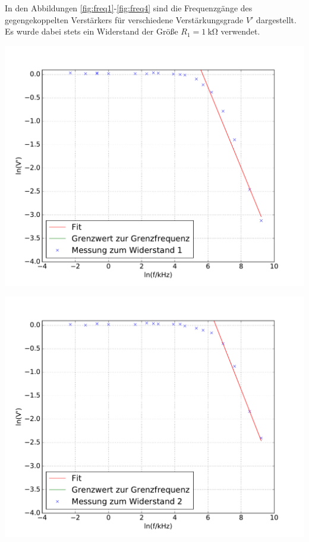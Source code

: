 \documentclass[]{scrartcl}
\begin{document}
In den Abbildungen \ref{fig:freq1}-\ref{fig:freq4} sind die Frequenzgänge des gegengekoppelten Verstärkers für verschiedene Verstärkungsgrade $V'$ dargestellt. Es wurde dabei stets ein Widerstand der Größe $R_1=\SI{1}{\kilo\ohm}$ verwendet. \\
\begin{minipage}[t]{0.5\textwidth}
	\includegraphics[width=\textwidth]{images/plot1.pdf}
	\label{fig:freq1}
\end{minipage}
\begin{minipage}[t]{0.5\textwidth}
	\includegraphics[width=\textwidth]{images/plot2.pdf}
\end{minipage} \\
\end{document}
